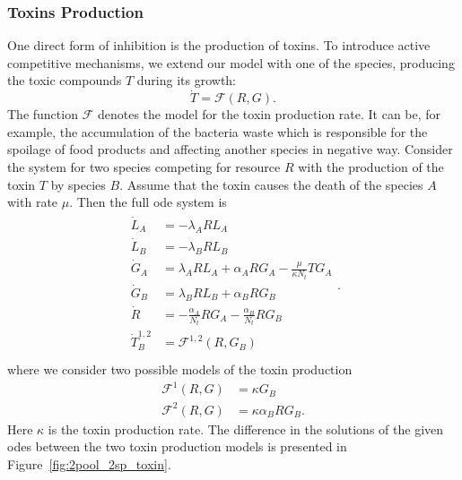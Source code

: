 \documentclass[10pt,twocolumn,5p]{elsarticle}
\numberwithin{equation}{section}
\begin{document}
\subsubsection{Toxins Production}
One direct form of inhibition is the production of toxins.
To introduce active competitive mechanisms, we extend our model with one of the species, producing the toxic compounds $T$ during its growth:
\begin{equation}
    \dot{T} = \mathcal{F}(R,G).
\end{equation}
The function $\mathcal{F}$ denotes the model for the toxin production rate.
It can be, for example, the accumulation of the bacteria waste which is responsible for the spoilage of food products and affecting another species in negative way.
Consider the system for two species competing for resource $R$ with the production of the toxin $T$ by species $B$.
Assume that the toxin causes the death of the species $A$ with rate $\mu$.
Then the full \ac{ode} system is
\begin{align}
    \begin{split}
        \dot{L}_A &= - \lambda_A R L_A\\
        \dot{L}_B &= - \lambda_B R L_B \\
        \dot{G}_A &= \lambda_A R L_A + \alpha_A R G_A - \frac{\mu}{\kappa N_t} T G_A\\
        \dot{G}_B &= \lambda_B R L_B + \alpha_B R G_B\\ 
        \dot{R} &= -\frac{\alpha_A}{N_t} R G_A-\frac{\alpha_B}{N_t} R G_B\\
        \dot{T}_{B}^{1,2} &= \mathcal{F}^{1,2} (R, G_B) \\
    \end{split}.
    \label{eq:model_2sp_toxin}
\end{align}
%
where we consider two possible models of the toxin production
\begin{align}
    \mathcal{F}^1(R,G)&=\kappa G_B\\
    \mathcal{F}^2(R,G)&=\kappa\alpha_B R G_B.
\end{align}
Here $\kappa$ is the toxin production rate.
The difference in the solutions of the given \acp{ode} between the two toxin production models is presented in Figure~\ref{fig:2pool_2sp_toxin}.
%
%
\end{document}
